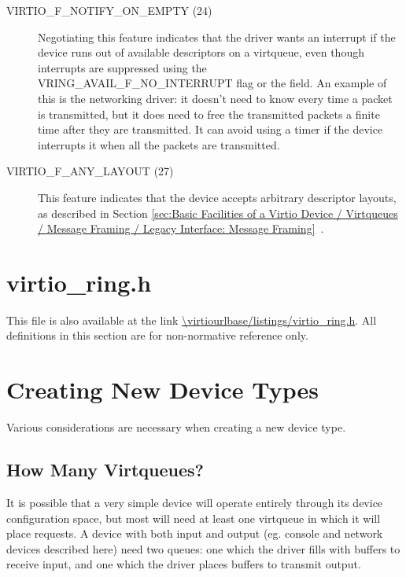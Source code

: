 \begin{description}
\item[VIRTIO_F_NOTIFY_ON_EMPTY (24)] Negotiating this feature
  indicates that the driver wants an interrupt if the device runs
  out of available descriptors on a virtqueue, even though
  interrupts are suppressed using the VRING_AVAIL_F_NO_INTERRUPT
  flag or the  field. An example of this is the
  networking driver: it doesn't need to know every time a packet
  is transmitted, but it does need to free the transmitted
  packets a finite time after they are transmitted. It can avoid
  using a timer if the device interrupts it when all the packets
  are transmitted.

\item[VIRTIO_F_ANY_LAYOUT (27)] This feature indicates that the device
  accepts arbitrary descriptor layouts, as described in Section
  \ref{sec:Basic Facilities of a Virtio Device / Virtqueues / Message Framing / Legacy Interface: Message Framing}~.
\end{description}

\chapter{virtio_ring.h}\label{sec:virtio-ring.h}

This file is also available at the link
\url{\virtiourlbase/listings/virtio_ring.h}.
All definitions in this section are for non-normative reference
only.



\chapter{Creating New Device Types}\label{sec:Creating New Device Types}

Various considerations are necessary when creating a new device
type.

\section{How Many Virtqueues?}\label{sec:Creating New Device Types / How Many Virtqueues?}

It is possible that a very simple device will operate entirely
through its device configuration space, but most will need at least one
virtqueue in which it will place requests. A device with both
input and output (eg. console and network devices described here)
need two queues: one which the driver fills with buffers to
receive input, and one which the driver places buffers to
transmit output.

